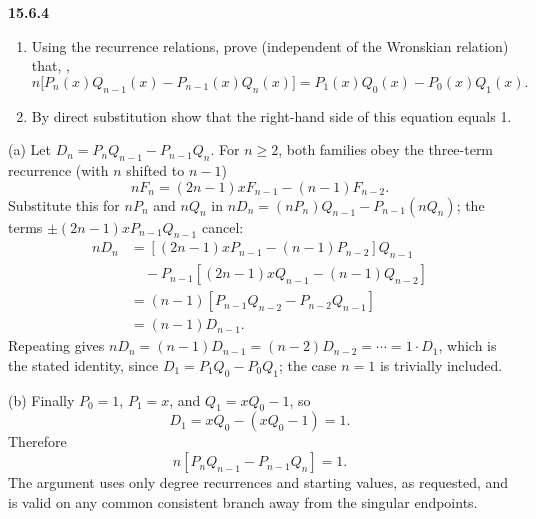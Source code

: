 \par\bigskip
\noindent\textbf{15.6.4}
\begin{enumerate}
\item[(a)] Using the recurrence relations, prove (independent of the
Wronskian relation) that, ,
\[
n\big[P_{n}(x)Q_{n-1}(x)-P_{n-1}(x)Q_{n}(x)\big]
=P_{1}(x)Q_{0}(x)-P_{0}(x)Q_{1}(x).
\]
\item[(b)] By direct substitution show that the right-hand side of
this equation equals 1.
\end{enumerate}
\solution
(a) Let $D_n=P_nQ_{n-1}-P_{n-1}Q_n$. For $n\ge2$, both families obey
the three-term recurrence (with $n$ shifted to $n-1$)
\[
nF_n=(2n-1)xF_{n-1}-(n-1)F_{n-2}.
\]
Substitute this for $nP_n$ and $nQ_n$ in $nD_n=(nP_n)Q_{n-1}-P_{n-1}(nQ_n)$;
the terms $\pm(2n-1)xP_{n-1}Q_{n-1}$ cancel:
\begin{align*}
nD_n
&=[(2n-1)xP_{n-1}-(n-1)P_{n-2}]Q_{n-1}\\
&\quad-P_{n-1}[(2n-1)xQ_{n-1}-(n-1)Q_{n-2}]\\
&=(n-1)[P_{n-1}Q_{n-2}-P_{n-2}Q_{n-1}]\\
&=(n-1)D_{n-1}.
\end{align*}
Repeating gives $nD_n=(n-1)D_{n-1}=(n-2)D_{n-2}=\cdots=1\cdot D_1$,
which is the stated identity, since $D_1=P_1Q_0-P_0Q_1$; the case
$n=1$ is trivially included.

(b) Finally $P_0=1$, $P_1=x$, and $Q_1=xQ_0-1$, so
\[
D_1=xQ_0-(xQ_0-1)=1.
\]
Therefore
\[
\boxed{n[P_nQ_{n-1}-P_{n-1}Q_n]=1}.
\]
The argument uses only degree recurrences and starting values, as
requested, and is valid on any common consistent branch away from
the singular endpoints.
